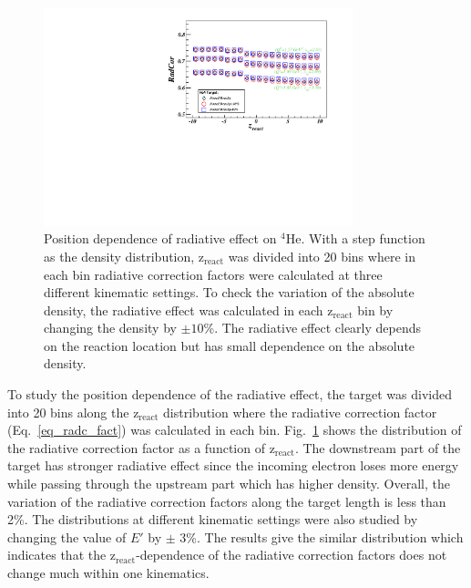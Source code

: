  \begin{figure}[!ht]
\begin{center}
  \includegraphics[angle=0,width=0.8\textwidth]{./figures/xemc/He4_RadC}
  \caption[Position dependence of radiative effect on $\mathrm{^{4}He}$]{\footnotesize{Position dependence of radiative effect on $\mathrm{^{4}He}$. With a step function as the density distribution, $\mathrm{z_{react}}$ was divided into 20 bins where in each bin radiative correction factors were calculated at three different kinematic settings. To check the variation of the absolute density, the radiative effect was calculated in each $\mathrm{z_{react}}$ bin by changing the density by $\mathrm{\pm 10}$\%. The radiative effect clearly depends on the reaction location but has small dependence on the absolute density.}}
  \label{he4_rad_check}
 \end{center}
\end{figure}
  To study the position dependence of the radiative effect, the target was divided into 20 bins along the $\mathrm{z_{react}}$ distribution where the radiative correction factor (Eq.~\eqref{eq_radc_fact}) was calculated in each bin. Fig.~\ref{he4_rad_check} shows the distribution of the radiative correction factor as a function of $\mathrm{z_{react}}$. The downstream part of the target has stronger radiative effect since the incoming electron loses more energy while passing through the upstream part which has higher density. Overall, the variation of the radiative correction factors along the target length is less than 2\%. The distributions at different kinematic settings were also studied by changing the value of $E'$ by $\mathrm{\pm}$ 3\%. The results give the similar distribution which indicates that the $\mathrm{z_{react}}$-dependence of the radiative correction factors does not change much within one kinematics.
  
